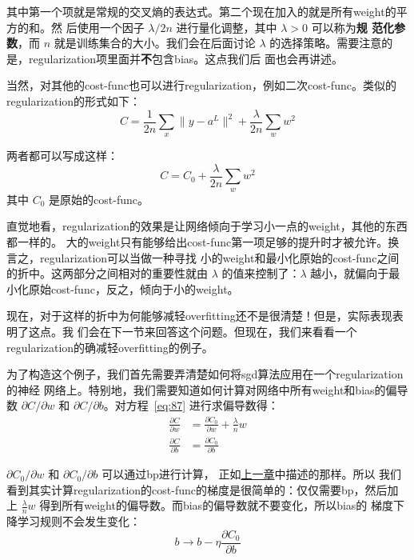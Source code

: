 其中第一个项就是常规的交叉熵的表达式。第二个现在加入的就是所有\gls*{weight}的平方的和。然
后使用一个因子 $\lambda / 2n$ 进行量化调整，其中 $\lambda > 0$ 可以称为\textbf{规
  范化参数}，而 $n$ 就是训练集合的大小。我们会在后面讨论
$\lambda$ 的选择策略。需要注意的是，\gls*{regularization}项里面并\textbf{不}包含\gls*{bias}。这点我们后
面也会再讲述。

当然，对其他的\gls*{cost-func}也可以进行\gls*{regularization}，例如二次\gls*{cost-func}。类似的\gls*{regularization}的形式如下：
\begin{equation}
  C = \frac{1}{2n} \sum_x \|y-a^L\|^2 + \frac{\lambda}{2n} \sum_w w^2
  \label{eq:86}\tag{86}
\end{equation}

两者都可以写成这样：
\begin{equation}
  C = C_0 + \frac{\lambda}{2n} \sum_w w^2
  \label{eq:87}\tag{87}
\end{equation}
其中 $C_0$ 是原始的\gls*{cost-func}。

直觉地看，\gls*{regularization}的效果是让网络倾向于学习小一点的\gls*{weight}，其他的东西都一样的。
大的\gls*{weight}只有能够给出\gls*{cost-func}第一项足够的提升时才被允许。换言之，\gls*{regularization}可以当做一种寻找
小的\gls*{weight}和最小化原始的\gls*{cost-func}之间的折中。这两部分之间相对的重要性就由 $\lambda$
的值来控制了：$\lambda$ 越小，就偏向于最小化原始\gls*{cost-func}，反之，倾向于小的\gls*{weight}。

现在，对于这样的折中为何能够减轻\gls*{overfitting}还不是很清楚！但是，实际表现表明了这点。我
们会在下一节来回答这个问题。但现在，我们来看看一个\gls*{regularization}的确减轻\gls*{overfitting}的例子。

为了构造这个例子，我们首先需要弄清楚如何将\gls*{sgd}算法应用在一个\gls*{regularization}的神经
网络上。特别地，我们需要知道如何计算对网络中所有\gls*{weight}和\gls*{bias}的偏导数 $\partial
C/\partial w$ 和 $\partial C/\partial b$。对方程~\eqref{eq:87} 进行求偏导数得：
\begin{align}
  \frac{\partial C}{\partial w} & = \frac{\partial C_0}{\partial w} +
                                  \frac{\lambda}{n} w \label{eq:88}\tag{88} \\
  \frac{\partial C}{\partial b} & = \frac{\partial C_0}{\partial b} \label{eq:89}\tag{89}
\end{align}

$\partial C_0/\partial w$ 和 $\partial C_0/\partial b$ 可以通过\gls*{bp}进行计算，
正如\hyperref[ch:HowTheBackpropagationAlgorithmWorks]{上一章}中描述的那样。所以
我们看到其实计算\gls*{regularization}的\gls*{cost-func}的梯度是很简单的：仅仅需要\gls*{bp}，然后加上
$\frac{\lambda}{n} w$ 得到所有\gls*{weight}的偏导数。而\gls*{bias}的偏导数就不要变化，所以\gls*{bias}的
梯度下降学习规则不会发生变化：
\begin{equation}
  b \rightarrow b -\eta \frac{\partial C_0}{\partial b}
  \label{eq:90}\tag{90}
\end{equation}

